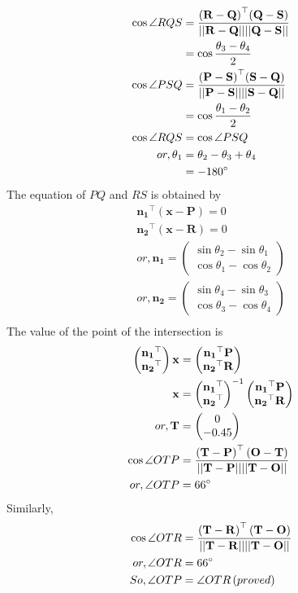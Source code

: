 \documentclass[12pt]{article}
\providecommand{\brak}[1]{\ensuremath{\left(#1\right)}}
\providecommand{\myvec}[1]{\ensuremath{\begin{pmatrix}#1\end{pmatrix}}}
\providecommand{\norm}[1]{\ensuremath{\lvert|#1\rvert|}}
\let\vec\mathbf
\begin{document}
\begin{align}
  \cos{\angle RQS}&=\frac{\vec{\brak{R-Q}}^{\top}\vec{\brak{Q-S}}}{\vec{\norm{R-Q}\norm{Q-S}}}\\
  &=\cos{\frac{\theta_3-\theta_4}{2}}\\
   \cos{\angle PSQ}&=\frac{\vec{\brak{P-S}}^{\top}\vec{\brak{S-Q}}}{\vec{\norm{P-S}\norm{S-Q}}}\\
  &=\cos{\frac{\theta_1-\theta_2}{2}}\\
   \cos{\angle RQS}&=\cos{\angle PSQ}\\
   or,\theta_1&=\theta_2-\theta_3+\theta_4\\
   &=-180\degree
  \end{align}
The equation of $PQ$ and $RS$ is obtained by
\begin{align}
  \vec{n_1}^{\top}\vec{\brak{x-P}}=0\\
  \vec{n_2}^{\top}\vec{\brak{x-R}}=0\\
  or,\vec{n_1}=\myvec{\sin{\theta_2}-\sin{\theta_1}\\\cos{\theta_1}-\cos{\theta_2}}\\
  or,\vec{n_2}=\myvec{\sin{\theta_4}-\sin{\theta_3}\\\cos{\theta_3}-\cos{\theta_4}}\\
 \end{align}
  The value of the point of the intersection is
\begin{align}
    \myvec{\vec{n_1}^{\top}\\\vec{n_2}^{\top}}\vec{x}&=\myvec{\vec{n_1}^{\top}\vec{P}\\\vec{n_2}^{\top}\vec{R}}\\
    \vec{x}&=\myvec{\vec{n_1}^{\top}\\\vec{n_2}^{\top}}^{-1}\myvec{\vec{n_1}^{\top}\vec{P}\\\vec{n_2}^{\top}\vec{R}}\\
        or,\vec{T} &= \myvec{0\\-0.45}\\
\cos{\angle OTP} &= \frac{\brak{\vec{T-P}}^{\top}\brak{\vec{O-T}}}{\vec{\norm{T-P}\norm{T-O}}}\\
or, \angle OTP&= 66\degree
\end{align}
Similarly,
\begin{align}
   \cos{\angle OTR} &= \frac{\brak{\vec{T-R}}^{\top}\brak{\vec{T-O}}}{\vec{\norm{T-R}\norm{T-O}}}\\
or, \angle OTR&= 66\degree \\
So,\angle OTP &= \angle OTR \brak{proved}
\end{align}
\end{document}
